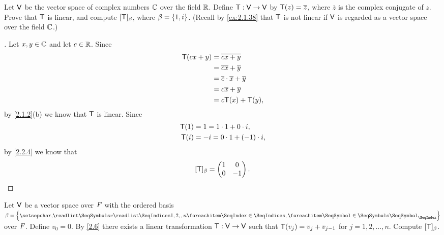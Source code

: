 \begin{ex}\label{ex:2.2.9}
  Let \(\mathsf{V}\) be the vector space of complex numbers \(\mathbb{C}\) over the field \(\mathbb{R}\).
  Define \(\mathsf{T} : \mathsf{V} \to \mathsf{V}\) by \(\mathsf{T}(z) = \overline{z}\), where \(\overline{z}\) is the complex conjugate of \(z\).
  Prove that \(\mathsf{T}\) is linear, and compute \([\mathsf{T}]_{\beta}\), where \(\beta = \left\lbrace1, i\right\rbrace\).
  (Recall by \cref{ex:2.1.38} that \(\mathsf{T}\) is not linear if \(\mathsf{V}\) is regarded as a vector space over the field \(\mathbb{C}\).)
\end{ex}

\begin{proof}[]
  Let \(x, y \in \mathbb{C}\) and let \(c \in \mathbb{R}\).
  Since
  \begin{align*}
    \mathsf{T}(cx + y) & = \overline{cx + y}                              \\
               & = \overline{cx} + \overline{y}                   \\
               & = \overline{c} \cdot \overline{x} + \overline{y} \\
               & = c \overline{x} + \overline{y}                  \\
               & = c \mathsf{T}(x) + \mathsf{T}(y),
  \end{align*}
  by \cref{2.1.2}(b) we know that \(\mathsf{T}\) is linear.
  Since
  \begin{align*}
    \mathsf{T}(1) & = 1 = 1 \cdot 1 + 0 \cdot i,     \\
    \mathsf{T}(i) & = -i = 0 \cdot 1 + (-1) \cdot i,
  \end{align*}
  by \cref{2.2.4} we know that
  \[
    [\mathsf{T}]_{\beta} = \begin{pmatrix}
      1 & 0  \\
      0 & -1
    \end{pmatrix}.
  \]
\end{proof}

\begin{ex}\label{ex:2.2.10}
  Let \(\mathsf{V}\) be a vector space over \(\mathit{F}\) with the ordered basis \(\beta = \set{\seq{v}{1,2,,n}}\) over \(\mathit{F}\).
  Define \(v_0 = 0\).
  By \cref{2.6} there exists a linear transformation \(\mathsf{T} : \mathsf{V} \to \mathsf{V}\) such that \(\mathsf{T}(v_j) = v_j + v_{j - 1}\) for \(j = 1, 2, \dots, n\).
  Compute \([\mathsf{T}]_{\beta}\).
\end{ex}

